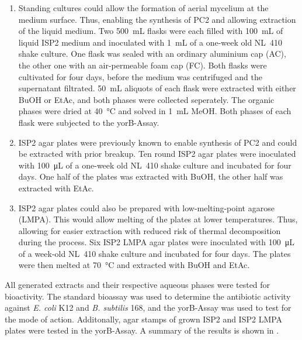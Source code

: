     \begin{enumerate}
        \item Standing cultures could allow the formation of aerial mycelium at the medium surface. Thus, enabling the synthesis of PC2 and allowing extraction of the liquid medium. Two \SI{500}{\milli\liter} flasks were each filled with \SI{100}{\milli\liter} of liquid ISP2 medium and inoculated with \SI{1}{\milli\liter} of a one-week old NL~410 shake culture. One flask was sealed with an ordinary aluminium cap (AC), the other one with an air-permeable foam cap (FC). Both flasks were cultivated for four days, before the medium was centrifuged and the supernatant filtrated. \SI{50}{\milli\liter} aliquots of each flask were extracted with either BuOH or EtAc, and both phases were collected seperately. The organic phases were dried at \SI{40}{\celsius} and solved in \SI{1}{\milli\liter} MeOH. Both phases of each flask were subjected to the yorB-Assay.
        \item ISP2 agar plates were previously known to enable synthesis of PC2 and could be extracted with prior breakup. Ten round ISP2 agar plates were inoculated with \SI{100}{\micro\liter} of a one-week old NL~410 shake culture and incubated for four days. One half of the plates was extracted with BuOH, the other half was extracted with EtAc.
        \item ISP2 agar plates could also be prepared with low-melting-point agarose (LMPA). This would allow melting of the plates at lower temperatures. Thus, allowing for easier extraction with reduced risk of thermal decomposition during the process. Six ISP2 LMPA agar plates were inoculated with \SI{100}{\micro\liter} of a week-old NL~410 shake culture and incubated for four days. The plates were then melted at \SI{70}{\celsius} and extracted with BuOH and EtAc.
    \end{enumerate}

    All generated extracts and their respective aqueous phases were tested for bioactivity. The standard bioassay was used to determine the antibiotic activity against \textit{E. coli} K12 and \textit{B. subtilis} 168, and the yorB-Assay was used to test for the mode of action. Additonally, agar stamps of grown ISP2 and ISP2 LMPA plates were tested in the yorB-Assay. A summary of the results is shown in .

